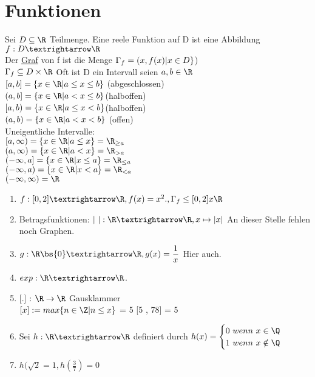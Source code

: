 \section*{Funktionen}
Sei $D\subseteq\R$ Teilmenge. Eine reele Funktion auf D ist eine Abbildung $f:D→\R$\\
%
Der \underline{Graf} von f ist die Menge $\Gamma_f = \/(x, f(x) | x \in D \}$) \\
$ \Gamma_f \subseteq D \times \R$ 
%
\bem Oft ist D ein Intervall
%
seien $a, b \in \R$ \\
$[a, b] = \{x \in \R| a \leq x \leq b\}$ (abgeschlossen)\\
$(a, b] = \{x \in \R| a < x \leq b\}$(halboffen)\\
$[a, b) = \{x \in \R| a \leq x < b\}$(halboffen)\\ %
$(a, b) = \{x \in \R| a < x < b\}$ (offen)\\
%
Uneigentliche Intervalle: \\
$[a, \infty) = \{x \in \R | a \leq x\} = \R_{\geq a}$\\
$(a, \infty) = \{x \in \R | a < x\} = \R_{> a}$\\
$(- \infty, a] = \{x \in \R | x \leq a\} = \R_{\leq a}$\\
$(- \infty, a) = \{x \in \R | x < a\} = \R_{< a}$\\
$(- \infty, \infty) = \R$\\
%
\begin{enumerate}
\item{$f:[0,2]→\R, f(x)=x^2., \Gamma_f \leq [0,2] x\R$
%
}
\item{Betragsfunktionen: $|\ |: \R→\R, x\mapsto|x|$
}
An dieser Stelle fehlen noch Graphen.
\item{$g:\R\bs\{0\}→\R, g(x)=\dfrac{1}{x}$
Hier auch.
}
\item{$exp:\R→\R$.}
\item{[.] : $\R \to \R$ Gausklammer\\
$[x] := max\{n \in \Z | n \leq x \}$
\bsp
[5] = 5 [5 , 78] = 5}
\item{Sei $h:\R→\R$ definiert durch $h(x)=\begin{cases}0\ wenn\ x\in\Q\\ 1\ wenn\ x\notin\Q\end{cases}$}
\item{$h(\sqrt{2} = 1, h (\frac{3}{7}) = 0$ }
\end{enumerate}
